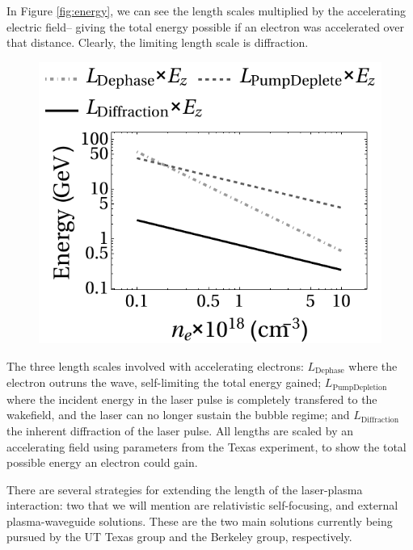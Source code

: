 \documentclass[12pt,letter]{article}
\begin{document}
    In Figure \ref{fig:energy}, we can see the length scales multiplied by the
    accelerating electric field-- giving the total energy possible if an
    electron was accelerated over that distance. Clearly, the limiting length
    scale is diffraction.
    \begin{marginfigure}
        \begin{subfigure}[t]{\marginparwidth}
            \includegraphics[width=\linewidth]{../figures/energy.pdf}
        \end{subfigure}
        \caption{The three length scales involved with accelerating electrons:
        $L_\mathrm{Dephase}$ where the electron outruns the wave, self-limiting
    the total energy gained; $L_\mathrm{Pump Depletion}$ where the incident
energy in the laser pulse is completely transfered to the wakefield, and the
laser can no longer sustain the bubble regime; and $L_\mathrm{Diffraction}$ the
inherent diffraction of the laser pulse. All lengths are scaled by an
accelerating field using parameters from the Texas
experiment\cite{Wang2013}, to show the total possible energy an electron
could gain.\label{fig:energy}}
    \end{marginfigure}

    There are several strategies for extending the length of the laser-plasma
    interaction: two that we will mention are relativistic self-focusing, and
    external plasma-waveguide solutions. These are the two main solutions
    currently being pursued by the UT Texas group and the Berkeley group,
    respectively.
\end{document}
